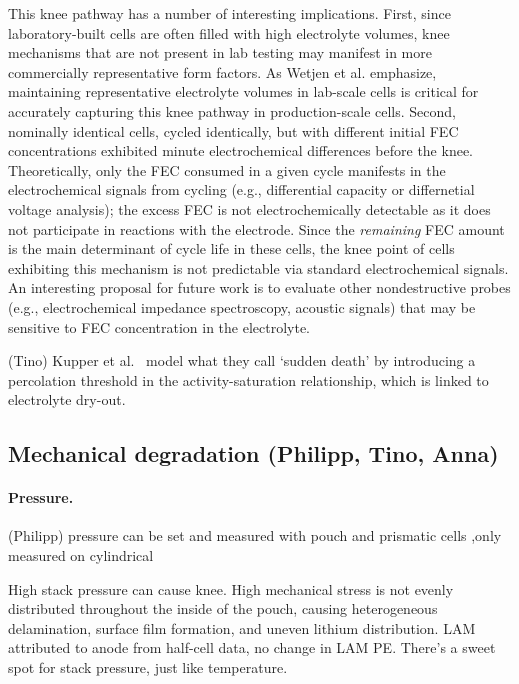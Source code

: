 \documentclass{article}
\begin{document}
This knee pathway has a number of interesting implications.
First, since laboratory-built cells are often filled with high electrolyte volumes, knee mechanisms that are not present in lab testing may manifest in more commercially representative form factors.
As Wetjen et al.\cite{wetjen_differentiating_2017} emphasize,
maintaining representative electrolyte volumes in lab-scale cells is critical for accurately capturing this knee pathway in production-scale cells.
Second, nominally identical cells, cycled identically, but with different initial FEC concentrations exhibited minute electrochemical differences before the knee.\cite{jung_consumption_2016}
Theoretically, only the FEC consumed in a given cycle manifests in the electrochemical signals from cycling (e.g., differential capacity or differnetial voltage analysis); the excess FEC is not electrochemically detectable as it does not participate in reactions with the electrode.
Since the \emph{remaining} FEC amount is the main determinant of cycle life in these cells, the knee point of cells exhibiting this mechanism is not predictable via standard electrochemical signals.
An interesting proposal for future work is to evaluate other nondestructive probes (e.g., electrochemical impedance spectroscopy\cite{zhang_identifying_2020}, acoustic signals\cite{knehr_understanding_2018}) that may be sensitive to FEC concentration in the electrolyte.

(Tino) Kupper et al.~\cite{kupper_end--life_2018} model what they call `sudden death' by introducing a percolation threshold in the activity-saturation relationship, which is linked to electrolyte dry-out.

\subsection{Mechanical degradation (Philipp, Tino, Anna)}

\paragraph{Pressure.} (Philipp)
pressure can be set and measured with pouch \cite{wunsch_investigation_2019} and prismatic cells\cite{cannarella_stress_2014} ,only measured on cylindrical \cite{willenberg_high-precision_2020}

High stack pressure can cause knee. High mechanical stress is not evenly distributed throughout the inside of the pouch, causing heterogeneous delamination, surface film formation, and uneven lithium distribution. LAM attributed to anode from half-cell data, no change in LAM PE. There's a sweet spot for stack pressure, just like temperature.\cite{cannarella_stress_2014}
\end{document}
